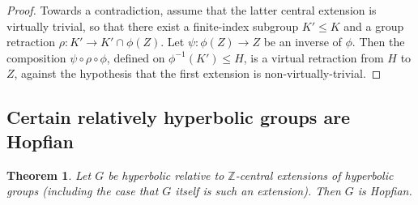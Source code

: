 \documentclass[svgnames]{amsart}
\theoremstyle{plain}
\newtheorem{thm}{Theorem}[section]
\theoremstyle{definition}
\newcommand{\Z}{\mathbb{Z}}
\begin{document}
\begin{proof} Towards a contradiction, assume that the latter central extension is virtually trivial, so that there exist a finite-index subgroup $K'\le K$ and a group retraction $\rho\colon K'\to K'\cap \phi(Z)$. Let $\psi\colon \phi(Z)\to Z$ be an inverse of $\phi$. Then the composition $\psi\circ \rho\circ \phi$, defined on $\phi^{-1}(K')\le H$, is a virtual retraction from $H$ to $Z$, against the hypothesis that the first extension is non-virtually-trivial.
\end{proof}


\subsection{Certain relatively hyperbolic groups are Hopfian}
\begin{thm}
\label{thm:rel_hyp_hopf}
    Let $G$ be hyperbolic relative to $\Z$-central extensions of hyperbolic groups (including the case that $G$ itself is such an extension). Then $G$ is Hopfian.
\end{thm}
\end{document}
